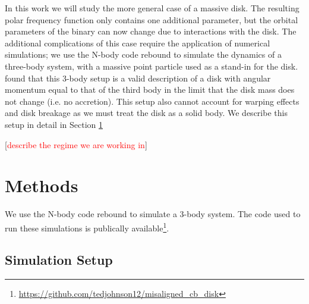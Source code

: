\documentclass[twocolumn]{aastex631}
\newcommand\codeurl[0]{\url{https://github.com/tedjohnson12/misaligned_cb_disk}}
\newcommand\question[1]{[\textcolor{red}{#1}]}
\begin{document}
In this work we will study the more general case of a massive disk. The resulting polar frequency function only contains one
additional parameter, but the orbital parameters of the binary can now change due to interactions with the disk. The additional
complications of this case require the application of numerical simulations; we use the N-body code {\sc rebound} \citep{rebound} to simulate the
dynamics of a three-body system, with a massive point particle used as a stand-in for the disk. \citet{abod2022} found that this 3-body
setup is a valid description of a disk with angular momentum equal to that of the third body in the limit that the disk mass does not change
(i.e. no accretion). This setup also cannot account for warping effects and disk breakage as we must treat the disk as a solid body. 
We describe this setup in detail in Section \ref{sec:methods}

\question{describe the regime we are working in}


\section{Methods}
\label{sec:methods}
We use the N-body code {\sc rebound} \citep{rebound} to simulate a 3-body system. The code used to run these simulations is publically
available\footnote{\codeurl}.

\subsection{Simulation Setup}
\label{subsec:setup}
\end{document}
